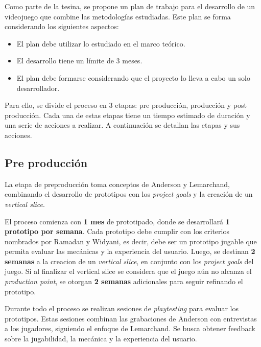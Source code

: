 \par Como parte de la tesina, se propone un plan de trabajo para el desarrollo de un videojuego que combine las metodologías estudiadas. Este plan se forma considerando los siguientes aspectos:
\begin{itemize}
    \item El plan debe utilizar lo estudiado en el marco teórico.
    \item El desarrollo tiene un límite de 3 meses.
    \item El plan debe formarse considerando que el proyecto lo lleva a cabo un solo desarrollador.
\end{itemize}
\par Para ello, se divide el proceso en 3 etapas: pre producción, producción y post producción. Cada una de estas etapas tiene un tiempo estimado de duración y una serie de acciones a realizar. A continuación se detallan las etapas y sus acciones. 
%
%
\subsection{Pre producción}
\par La etapa de preproducción toma conceptos de Anderson y Lemarchand, combinando el desarrollo de prototipos con los \textit{project goals} y la creación de un \textit{vertical slice}. 
\par El proceso comienza con \textbf{1 mes} de prototipado, donde se desarrollará \textbf{1 prototipo por semana}. Cada prototipo debe cumplir con los criterios nombrados por Ramadan y Widyani, es decir, debe ser un prototipo jugable que permita evaluar las mecánicas y la experiencia del usuario. Luego, se destinan \textbf{2 semanas} a la creacion de un \textit{vertical slice}, en conjunto con los \textit{project goals} del juego. Si al finalizar el vertical slice se considera que el juego aún no alcanza el \textit{production point}, se otorgan \textbf{2 semanas} adicionales para seguir refinando el prototipo.
\par Durante todo el proceso se realizan sesiones de \textit{playtesting} para evaluar los prototipos. Estas sesiones combinan las grabaciones de Anderson con entrevistas a los jugadores, siguiendo el enfoque de Lemarchand. Se busca obtener feedback sobre la jugabilidad, la mecánica y la experiencia del usuario.
%
%
